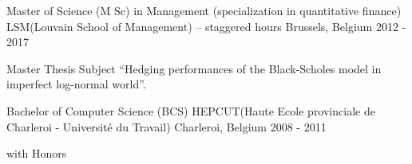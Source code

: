 

\begin{cventries}

  \cventry
    {Master of Science (M Sc) in Management (specialization in quantitative finance)} %
    {LSM(Louvain School of Management) -- staggered hours} %
    {Brussels, Belgium} %
    {2012 - 2017} %
    {
      \begin{cvdesc} %
        \item[Master Thesis Subject] ``Hedging performances of the Black-Scholes model in imperfect log-normal world''.
      \end{cvdesc}
    }

  \cventry
    {Bachelor of Computer Science (BCS)} %
    {HEPCUT(Haute Ecole provinciale de Charleroi - Universit\'e du Travail)} %
    {Charleroi, Belgium} %
    {2008 - 2011} %
    {
      \begin{cvitems} %
        \item {with Honors}
      \end{cvitems}
    }

\end{cventries}
